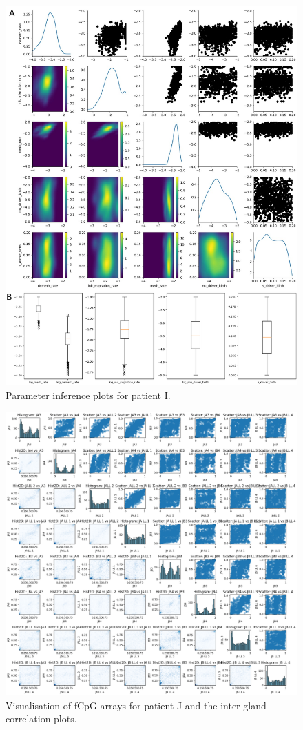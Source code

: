 \begin{figure}[h]
\centering
\includegraphics[width=\textwidth]{Chapter_5/figures/inference_I.pdf}
\caption{Parameter inference plots for patient I.}
\label{fig:inference_I}
\end{figure}

\begin{figure}[ht]
\centering
\includegraphics[width=\textwidth]{Chapter_5/figures/fCpG_loci_J.png}
\caption{Visualisation of fCpG arrays for patient J and the inter-gland
    correlation plots.}
\label{fig:vis_J}
\end{figure}

